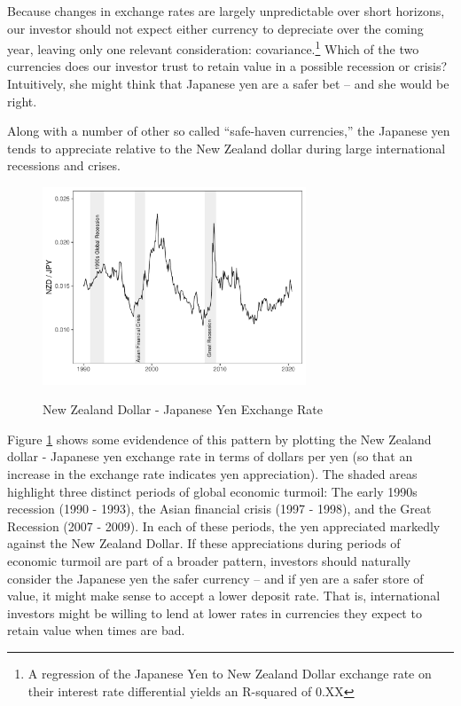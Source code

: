 Because changes in exchange rates are largely unpredictable over short
horizons, our investor should not expect either currency to depreciate
over the coming year, leaving only one relevant consideration:
covariance.\footnote{A regression of the Japanese Yen to New Zealand Dollar
exchange rate on their interest rate differential yields an R-squared of
0.XX} Which of the two currencies does our investor trust to
retain value in a possible recession or crisis? Intuitively, she might
think that Japanese yen are a safer bet -- and she would be right.

Along with a number of other so called ``safe-haven currencies,'' the
Japanese yen tends to appreciate relative to the New Zealand dollar
during large international recessions and crises. 
\begin{figure}[htp!]
  \centering
  \caption{New Zealand Dollar - Japanese Yen Exchange Rate}
  \includegraphics[width=0.7\textwidth]{Exhibits/Figure_FX_JPYNZD.pdf}
  \label{fig:spot}
\end{figure}
Figure
\ref{fig:spot} shows some evidendence of this pattern by plotting the New Zealand dollar - Japanese yen exchange
rate in terms of dollars per yen (so that an increase in the exchange rate
indicates yen appreciation). The shaded areas highlight three distinct
periods of global economic turmoil: The early 1990s recession (1990 -
1993), the Asian financial crisis (1997 - 1998), and the Great
Recession (2007 - 2009). In each of these periods, the yen appreciated
markedly against the New Zealand Dollar. If these appreciations during
periods of economic turmoil are part of a broader pattern, investors
should naturally consider the Japanese yen the safer currency -- and
if yen are a safer
store of value, it might make sense to accept a lower deposit rate.
That is, international investors might be willing to lend at lower
rates in currencies they expect to retain value when times are bad.


